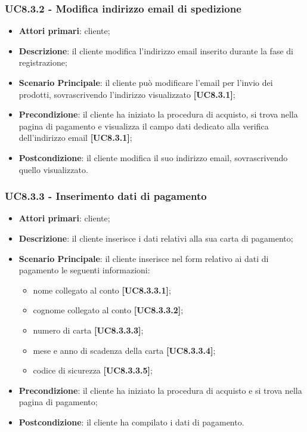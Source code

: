 \subsubsection{UC8.3.2 - Modifica indirizzo email di spedizione}
\begin{itemize}
\item \textbf{Attori primari}: cliente;
\item \textbf{Descrizione}: il cliente modifica l'indirizzo email inserito durante la fase di registrazione;
\item \textbf{Scenario Principale}: il cliente può modificare l'email per l'invio dei prodotti, sovrascrivendo l'indirizzo visualizzato \textbf{[UC8.3.1]};
\item \textbf{Precondizione}:  il cliente ha iniziato la procedura di acquisto, si trova nella pagina di pagamento e visualizza il campo dati dedicato alla verifica dell'indirizzo email \textbf{[UC8.3.1]};
\item \textbf{Postcondizione}: il cliente modifica il suo indirizzo email, sovrascrivendo quello visualizzato.
\end{itemize}

\subsubsection{UC8.3.3 - Inserimento dati di pagamento}
\begin{itemize}
\item \textbf{Attori primari}: cliente;
\item \textbf{Descrizione}: il cliente inserisce i dati relativi alla sua carta di pagamento;
\item \textbf{Scenario Principale}: il cliente inserisce nel form relativo ai dati di pagamento le seguenti informazioni:
\begin{itemize}
	\item nome collegato al conto \textbf{[UC8.3.3.1]};
	\item cognome collegato al conto \textbf{[UC8.3.3.2]};
	\item numero di carta \textbf{[UC8.3.3.3]};
	\item mese e anno di scadenza della carta \textbf{[UC8.3.3.4]};
	\item codice di sicurezza \textbf{[UC8.3.3.5]};
\end{itemize}
\item \textbf{Precondizione}: il cliente ha iniziato la procedura di acquisto e si trova nella pagina di pagamento;
\item \textbf{Postcondizione}: il cliente ha compilato i dati di pagamento.
\end{itemize}

